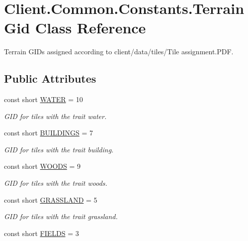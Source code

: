 \hypertarget{classClient_1_1Common_1_1Constants_1_1TerrainGid}{}\section{Client.\+Common.\+Constants.\+Terrain\+Gid Class Reference}
\label{classClient_1_1Common_1_1Constants_1_1TerrainGid}


Terrain G\+I\+Ds assigned according to \textquotesingle{}client/data/tiles/\+Tile assignment.\+P\+D\+F\textquotesingle{}.  


\subsection*{Public Attributes}
\begin{DoxyCompactItemize}
\item 
const short \hyperlink{classClient_1_1Common_1_1Constants_1_1TerrainGid_a9f9c778def977a1635f05acc03764a8c}{W\+A\+T\+E\+R} = 10
\begin{DoxyCompactList}\small\item\em G\+I\+D for tiles with the trait water. \end{DoxyCompactList}\item 
const short \hyperlink{classClient_1_1Common_1_1Constants_1_1TerrainGid_a7a7944292196dc6c9e228f56307a36a2}{B\+U\+I\+L\+D\+I\+N\+G\+S} = 7
\begin{DoxyCompactList}\small\item\em G\+I\+D for tiles with the trait building. \end{DoxyCompactList}\item 
const short \hyperlink{classClient_1_1Common_1_1Constants_1_1TerrainGid_ae14b3f7ff6960d5c57bc39b69adbe47d}{W\+O\+O\+D\+S} = 9
\begin{DoxyCompactList}\small\item\em G\+I\+D for tiles with the trait woods. \end{DoxyCompactList}\item 
const short \hyperlink{classClient_1_1Common_1_1Constants_1_1TerrainGid_a81f3bca3547e112877391574e5589316}{G\+R\+A\+S\+S\+L\+A\+N\+D} = 5
\begin{DoxyCompactList}\small\item\em G\+I\+D for tiles with the trait grassland. \end{DoxyCompactList}\item 
const short \hyperlink{classClient_1_1Common_1_1Constants_1_1TerrainGid_a27c5e5ab4bc50f174e9f7a8c32e8e41e}{F\+I\+E\+L\+D\+S} = 3

\end{DoxyCompactItemize}
